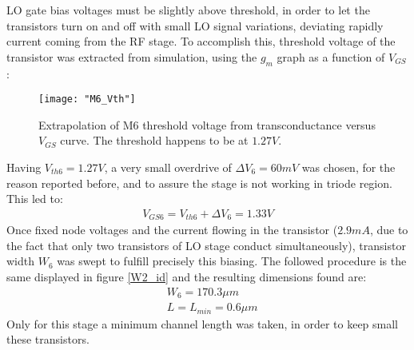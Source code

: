 LO gate bias voltages must be slightly above threshold, in order to let the transistors turn on and off with small LO signal variations, deviating rapidly current coming from the RF stage. To accomplish this, threshold voltage of the transistor was extracted from simulation, using the \(g_{m}\) graph as a function of \(V_{GS}\):
\begin{figure}[H]
	\centering
	\texttt{[image: "M6\_Vth"]}
	\caption{Extrapolation of M6 threshold voltage from transconductance versus \(V_{GS}\) curve. The threshold happens to be at \(1.27V\).}
	\label{M6_Vth}
\end{figure}
Having \(V_{th6}=1.27V\), a very small overdrive of \( \Delta V_6=60mV \) was chosen, for the reason reported before, and to assure the stage is not working in triode region. This led to:
\begin{align}
	V_{GS6}=V_{th6}+\Delta V_6=1.33V \nonumber
\end{align}
Once fixed node voltages and the current flowing in the transistor (\(2.9mA\), due to the fact that only two transistors of LO stage conduct simultaneously), transistor width \(W_6\) was swept to fulfill precisely this biasing. The followed procedure is the same displayed in figure \ref{W2_id} and the resulting dimensions found are:
\begin{align}
	&W_6=170.3\mu m \nonumber\\
	&L = L_{min} = 0.6\mu m \nonumber
\end{align}                                                                      
Only for this stage a minimum channel length was taken, in order to keep small these transistors.
                                                                                 
